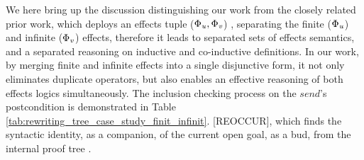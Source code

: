 \documentclass[acmsmall,review,anonymous]{acmart}\settopmatter{printfolios=true,printccs=false,printacmref=false}
\newcommand{\effect}{\textcolor{black}{\ensuremath{\mathrm{\Phi}}}}
\newcommand{\code}[1]{{\tt{\ensuremath{\m{#1}}}}}
\newcommand{\m}{\mathit}
\newcommand\tabref[1]{Table \textcolor{black}{\ref{#1}}.}
\begin{document}
We here bring up the discussion distinguishing our work from the closely related prior work,  which deploys an effects tuple (\code{\effect_{u},\effect_{v}}) \cite{nanjo2018fixpoint},  separating the finite (\code{\effect_{u}}) and infinite (\code{\effect_{v}}) effects, therefore it leads to separated sets of effects semantics, and a separated reasoning on inductive and co-inductive definitions. 
In our work, by merging finite and infinite effects into a single disjunctive form, it not only eliminates duplicate operators, but also enables an effective reasoning of both effects logics simultaneously.  
The inclusion checking process on the \code{send}'s postcondition is demonstrated in \tabref{tab:rewriting_tree_case_study_finit_infinit} [REOCCUR], which finds the syntactic identity, as a companion, of the current open goal, as a bud, from the internal proof tree \cite{brotherston2005cyclic}. 
\end{document}
